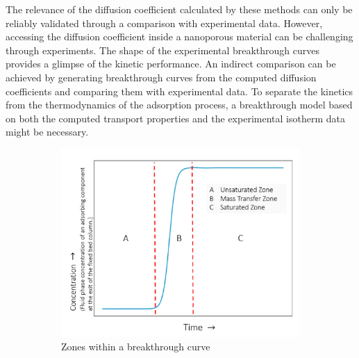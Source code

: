 \documentclass[main]{subfiles}
\begin{document}
The relevance of the diffusion coefficient calculated by these methods can only be reliably validated through a comparison with experimental data. However, accessing the diffusion coefficient inside a nanoporous material can be challenging through experiments. The shape of the experimental breakthrough curves provides a glimpse of the kinetic performance. An indirect comparison can be achieved by generating breakthrough curves from the computed diffusion coefficients and comparing them with experimental data. To separate the kinetics from the thermodynamics of the adsorption process, a breakthrough model based on both the computed transport properties and the experimental isotherm data might be necessary.

\begin{figure}[ht]
  \centering
  \hspace{0.5cm}
  \begin{subfigure}[b]{0.5\textwidth}
    \centering
    \includegraphics[width=\textwidth]{figures/6-perspectives/breakthrough_cuve_zones.png}
    \caption{Zones within a breakthrough curve}\label{fgr:breakthrough_zones}
  \end{subfigure}
  \hfill
  \begin{subfigure}[b]{0.33\textwidth}
    \centering

\end{subfigure}
\end{figure}
\end{document}
